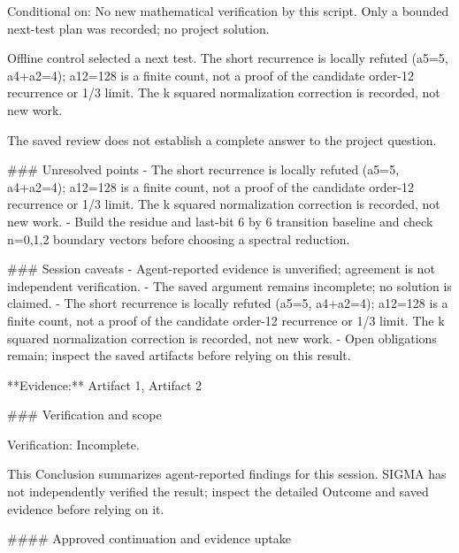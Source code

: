 \documentclass[11pt]{article}
\begin{document}
Conditional on: No new mathematical verification by this script. Only a bounded next-test plan was recorded; no project solution.

Offline control selected a next test. The short recurrence is locally refuted (a5=5, a4+a2=4); a12=128 is a finite count, not a proof of the candidate order-12 recurrence or 1/3 limit. The k squared normalization correction is recorded, not new work.

The saved review does not establish a complete answer to the project question.

\#\#\# Unresolved points
- The short recurrence is locally refuted (a5=5, a4+a2=4); a12=128 is a finite count, not a proof of the candidate order-12 recurrence or 1/3 limit. The k squared normalization correction is recorded, not new work.
- Build the residue and last-bit 6 by 6 transition baseline and check n=0,1,2 boundary vectors before choosing a spectral reduction.

\#\#\# Session caveats
- Agent-reported evidence is unverified; agreement is not independent verification.
- The saved argument remains incomplete; no solution is claimed.
- The short recurrence is locally refuted (a5=5, a4+a2=4); a12=128 is a finite count, not a proof of the candidate order-12 recurrence or 1/3 limit. The k squared normalization correction is recorded, not new work.
- Open obligations remain; inspect the saved artifacts before relying on this result.

**Evidence:** Artifact 1, Artifact 2

\#\#\# Verification and scope

Verification: Incomplete.

This Conclusion summarizes agent-reported findings for this session. SIGMA has not independently verified the result; inspect the detailed Outcome and saved evidence before relying on it.

\#\#\#\# Approved continuation and evidence uptake
\end{document}
